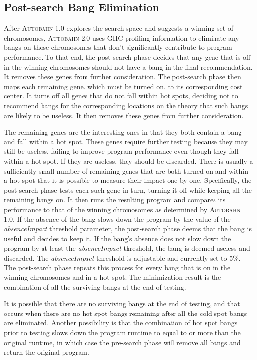\documentclass[format=sigplan, review=true]{acmart}
\newcommand{\hotspot}[0]{hot spot}
\newcommand{\hotspots}[0]{hot spots}
\newcommand{\coldspot}[0]{cold spot}
\newcommand{\useless}[0]{useless}
\newcommand{\Ao}[0]{\textsc{Autobahn 1.0}}
\newcommand{\At}[0]{\textsc{Autobahn 2.0}}
\newcommand{\preopt}[0]{pre-search}
\newcommand{\postopt}[0]{post-search}
\newcommand{\Postopt}[0]{Post-search}
\newcommand{\absim}[0]{\textit{absenceImpact}}
\begin{document}
\subsection{\Postopt{} Bang Elimination}

After \Ao{} explores the search space and suggests a winning set of
chromosomes, \At{} uses GHC profiling information to eliminate any
bangs on those chromosomes that don't significantly contribute to
program performance. To that end, 
the \postopt{} phase decides that any gene that is off in the winning
chromosomes should not have a bang in the final recommendation.
It removes these genes from further consideration. 
The \postopt{} phase then maps each remaining gene, which must be
turned on, to its corresponding cost center.  It turns off all genes
that do not fall within \hotspots{}, deciding not to recommend bangs
for the corresponding locations on the theory that such bangs are
likely to be \useless{}.  It then removes these genes from further
consideration. 

The remaining genes are the interesting ones in that they both
contain a bang and fall within a \hotspot{}. These genes require
further testing because they may still be \useless{}, failing to
improve program performance even though they fall within a \hotspot{}.
If they are \useless{}, they should be discarded. 
There is usually a sufficiently small number of remaining genes that
are both turned on and within a \hotspot{} that it is possible to
measure their impact one by one. Specifically, 
the \postopt{} phase tests each such gene in turn, turning
it off while keeping all the remaining bangs on.  It 
then runs the resulting program and compares its performance to that
of the winning chromosomes as determined by \Ao{}.
If the absence of the bang slows down the program by the value of the \absim{}
threshold parameter, the \postopt{} phase deems that the bang is useful and
decides to keep it. 
If the bang's absence does not slow down the program by at
least the \absim{} threshold, the bang is deemed \useless{} and
discarded. The \absim{} threshold is adjustable and currently set to
5\%. The \postopt{} phase repeats this process for every bang
that is on in the winning chromosomes and in a \hotspot{}. 
The minimization result is the combination of all the surviving
bangs at the end of testing.

It is possible that there are no surviving bangs at the end of testing, and that occurs when
there are no \hotspot{} bangs remaining after all the \coldspot{} bangs are eliminated. 
Another possibility is that the combination of \hotspot{} bangs prior to testing slows down 
the program runtime to equal to or more than the original runtime, in which case the \preopt{}
phase will remove all bangs and return the original program.
\end{document}
